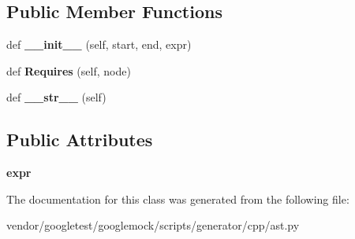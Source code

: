 \subsection*{Public Member Functions}
\begin{DoxyCompactItemize}
\item 
\mbox{\label{classcpp_1_1ast_1_1_expr_adc83f4b17d6e28a39781678692eb25aa}} 
def {\bfseries \+\_\+\+\_\+init\+\_\+\+\_\+} (self, start, end, expr)
\item 
\mbox{\label{classcpp_1_1ast_1_1_expr_a9c92416eb1285068f190dcda8fd33682}} 
def {\bfseries Requires} (self, node)
\item 
\mbox{\label{classcpp_1_1ast_1_1_expr_a7ee1896fbfa7819adbd0b2f89d11ecec}} 
def {\bfseries \+\_\+\+\_\+str\+\_\+\+\_\+} (self)
\end{DoxyCompactItemize}
\subsection*{Public Attributes}
\begin{DoxyCompactItemize}
\item 
\mbox{\label{classcpp_1_1ast_1_1_expr_a2f4e13fb0176f2616f8703103c806462}} 
{\bfseries expr}
\end{DoxyCompactItemize}


The documentation for this class was generated from the following file\+:\begin{DoxyCompactItemize}
\item 
vendor/googletest/googlemock/scripts/generator/cpp/ast.\+py\end{DoxyCompactItemize}
